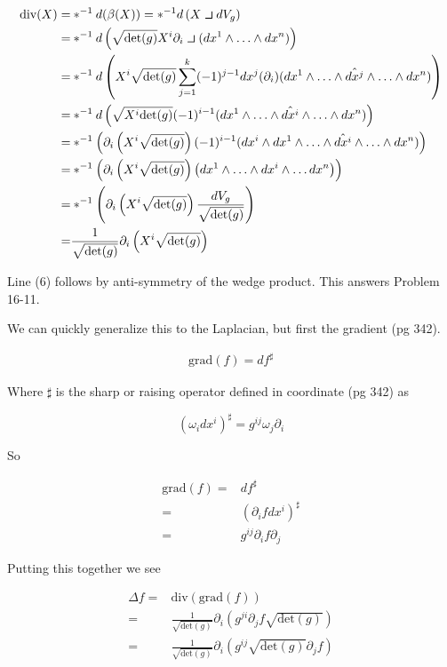 \documentclass[12pt]{article}
\newcommand{\intprodl}{%
    \mathbin{\scalebox{1.5}{$\lrcorner$}}%
}
\begin{document}
\begin{align}
\text{div}(X) =& \ast^{-1} d(\beta(X)) = \ast^{-1} d\left(X \intprodl dV_g\right)\\
=& \ast^{-1} d\left(\sqrt{\text{det}(g)} X^i \partial_i \intprodl (dx^1\wedge \ldots \wedge dx^n)\right)\\
=& \ast^{-1} d \left(X^i\sqrt{\text{det}(g)}  \sum_{j=1}^k (-1)^{j-1} dx^j(\partial_i) (dx^1\wedge \ldots \wedge \hat{dx^j} \wedge \ldots \wedge dx^n)\right)\\
=& \ast^{-1} d \left(\sqrt{X^i\text{det}(g)}  (-1)^{i-1} (dx^1 \wedge \ldots \wedge \hat{dx^i} \wedge \ldots \wedge dx^n)\right)\\
=& \ast^{-1} \left(\partial_i\left(X^i\sqrt{\text{det}(g)} \right) (-1)^{i-1} (dx^{i} \wedge dx^1 \wedge \ldots \wedge \hat{dx^i} \wedge \ldots \wedge dx^n)\right)\\
=& \ast^{-1} \left(\partial_i\left(X^i\sqrt{\text{det}(g)} \right) \left(dx^1 \wedge \ldots \wedge dx^i \wedge \ldots dx^n\right)\right)\\
=& \ast^{-1} \left(\partial_i \left(X^i\sqrt{\text{det}(g)}\right) \frac{dV_g}{\sqrt{\text{det}(g)}}\right)\\
=& \frac{1}{\sqrt{\text{det}(g)}} \partial_i \left(X^i\sqrt{\text{det}(g)} \right)
\end{align}

Line (6) follows by anti-symmetry of the wedge product.
This answers Problem 16-11.

We can quickly generalize this to the Laplacian, but first the gradient (pg 342).

\begin{align}
\text{grad}(f) = df^{\sharp}
\end{align}

Where $\sharp$ is the sharp or raising operator defined in coordinate (pg 342) as

$$
(\omega_i dx^i)^{\sharp} = g^{ij} \omega_j \partial_i
$$

So

\begin{align}
\text{grad}(f) =& df^{\sharp}\\
=& (\partial_i f dx^i)^{\sharp}\\
=& g^{ij} \partial_i f \partial_j
\end{align}

Putting this together we see

\begin{align}
\Delta f =& \text{div}(\text{grad}(f))\\
=& \frac{1}{\sqrt{\text{det}(g)}} \partial_i \left(g^{ji} \partial_j f \sqrt{\text{det}(g)}\right)\\
=& \frac{1}{\sqrt{\text{det}(g)}} \partial_i\left(g^{ij} \sqrt{\text{det}(g)} \partial_j f\right) 
\end{align}
\end{document}
